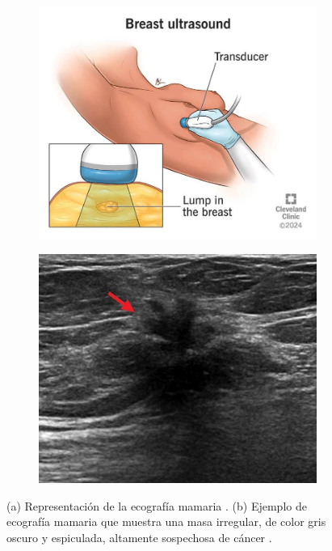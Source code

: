 \documentclass[a4paper,10pt]{book}
\begin{document}
\begin{figure}[h!]
	\centering
	\begin{subfigure}[c]{0.45\textwidth}
		\centering
		\includegraphics[width=\textwidth]{reports/assets/breast_ultrasound.jpg}
            \caption{}
		\label{fig:breast_ultrasound}
	\end{subfigure}
	\begin{subfigure}[c]{0.45\textwidth}
		\centering
		\includegraphics[width=\textwidth]{reports/assets/ultrasound.jpg}
            \caption{}
		\label{fig:ultrasound}
	\end{subfigure}
	\caption[Procedimiento y ejemplo de ecografía mamaria]{(a) Representación de la ecografía mamaria \cite{macauley_start--finish_2022}. (b) Ejemplo de ecografía mamaria que muestra una masa irregular, de color gris oscuro y espiculada, altamente sospechosa de cáncer \cite{noauthor_breast_nodate}.}
\label{fig:breast_ultrasound_comparison}
\end{figure}
\end{document}
